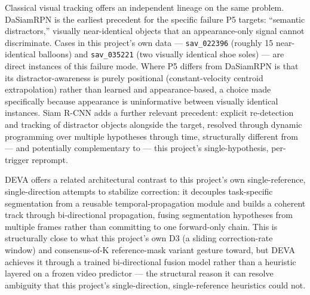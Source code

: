 \documentclass[11pt]{article}
\begin{document}
Classical visual tracking offers an independent lineage on the same problem. DaSiamRPN \citep{zhu2018} is the earliest precedent for the specific failure P5 targets: ``semantic distractors,'' visually near-identical objects that an appearance-only signal cannot discriminate. Cases in this project's own data — \texttt{sav\_022396} (roughly 15 near-identical balloons) and \texttt{sav\_035221} (two visually identical shoe soles) — are direct instances of this failure mode. Where P5 differs from DaSiamRPN is that its distractor-awareness is purely positional (constant-velocity centroid extrapolation) rather than learned and appearance-based, a choice made specifically because appearance is uninformative between visually identical instances. Siam R-CNN \citep{voigtlaender2020} adds a further relevant precedent: explicit re-detection and tracking of distractor objects alongside the target, resolved through dynamic programming over multiple hypotheses through time, structurally different from — and potentially complementary to — this project's single-hypothesis, per-trigger reprompt.

DEVA \citep{cheng2023deva} offers a related architectural contrast to this project's own single-reference, single-direction attempts to stabilize correction: it decouples task-specific segmentation from a reusable temporal-propagation module and builds a coherent track through bi-directional propagation, fusing segmentation hypotheses from multiple frames rather than committing to one forward-only chain. This is structurally close to what this project's own D3 (a sliding correction-rate window) and consensus-of-K reference-mask variant gesture toward, but DEVA achieves it through a trained bi-directional fusion model rather than a heuristic layered on a frozen video predictor — the structural reason it can resolve ambiguity that this project's single-direction, single-reference heuristics could not.
\end{document}
